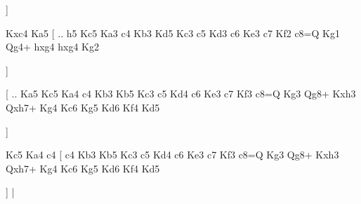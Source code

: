                       \dummy  \showboard  ]  
                      
                      Kxc4   Ka5 [ .. h5  Kc5 Ka3  c4 Kb3  Kd5 Kc3  c5 Kd3  c6 Ke3  c7 Kf2  c8=Q Kg1  Qg4+ hxg4  hxg4 Kg2   
                      
                      \dummy  \showboard  ]  
                      
                      [ .. Ka5  Kc5 Ka4  c4 Kb3  Kb5 Kc3  c5 Kd4  c6 Ke3  c7 Kf3  c8=Q Kg3  Qg8+ Kxh3  Qxh7+ Kg4  Kc6 Kg5  Kd6 Kf4  Kd5  
                      
                       \dummy  \showboard  ]  
                       
                       Kc5   Ka4    c4    [  c4 Kb3  Kb5 Kc3  c5 Kd4  c6 Ke3  c7 Kf3  c8=Q Kg3  Qg8+ Kxh3  Qxh7+ Kg4  Kc6 Kg5  Kd6 Kf4  Kd5   
                       
                       \dummy  \showboard  ] |